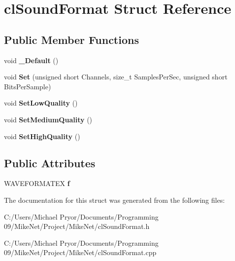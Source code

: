 \hypertarget{structcl_sound_format}{
\section{clSoundFormat Struct Reference}
\label{structcl_sound_format}
}
\subsection*{Public Member Functions}
\begin{DoxyCompactItemize}
\item 
\hypertarget{structcl_sound_format_ac08517aa05c294dec6755889a6c20ba7}{
void {\bfseries \_\-Default} ()}
\label{structcl_sound_format_ac08517aa05c294dec6755889a6c20ba7}

\item 
\hypertarget{structcl_sound_format_aea0c788f35b41471e8c7a7eefb2197a8}{
void {\bfseries Set} (unsigned short Channels, size\_\-t SamplesPerSec, unsigned short BitsPerSample)}
\label{structcl_sound_format_aea0c788f35b41471e8c7a7eefb2197a8}

\item 
\hypertarget{structcl_sound_format_a1d41d3af35b9a15bc8fe59738d6ec451}{
void {\bfseries SetLowQuality} ()}
\label{structcl_sound_format_a1d41d3af35b9a15bc8fe59738d6ec451}

\item 
\hypertarget{structcl_sound_format_a87ac2b66f1d6d8ddcf37cde57c4de270}{
void {\bfseries SetMediumQuality} ()}
\label{structcl_sound_format_a87ac2b66f1d6d8ddcf37cde57c4de270}

\item 
\hypertarget{structcl_sound_format_a858261ea0b7cbc5d6a8d0c3ce3d50a5d}{
void {\bfseries SetHighQuality} ()}
\label{structcl_sound_format_a858261ea0b7cbc5d6a8d0c3ce3d50a5d}

\end{DoxyCompactItemize}
\subsection*{Public Attributes}
\begin{DoxyCompactItemize}
\item 
\hypertarget{structcl_sound_format_a7e306cb514b460c39e59c08122e3c344}{
WAVEFORMATEX {\bfseries f}}
\label{structcl_sound_format_a7e306cb514b460c39e59c08122e3c344}

\end{DoxyCompactItemize}


The documentation for this struct was generated from the following files:\begin{DoxyCompactItemize}
\item 
C:/Users/Michael Pryor/Documents/Programming 09/MikeNet/Project/MikeNet/clSoundFormat.h\item 
C:/Users/Michael Pryor/Documents/Programming 09/MikeNet/Project/MikeNet/clSoundFormat.cpp\end{DoxyCompactItemize}
